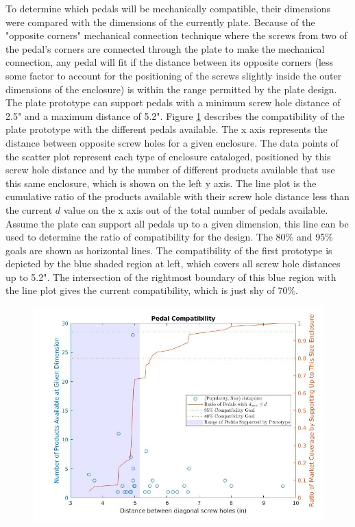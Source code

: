 \documentclass{article}
\begin{document}
	To determine which pedals will be mechanically compatible, their dimensions were compared with the dimensions of the currently plate.  Because of the "opposite corners" mechanical connection technique where the screws from two of the pedal's corners are connected through the plate to make the mechanical connection, any pedal will fit if the distance between its opposite corners (less some factor to account for the positioning of the screws slightly inside the outer dimensions of the enclosure) is within the range permitted by the plate design.  The plate prototype can support pedals with a minimum screw hole distance of 2.5" and a maximum distance of 5.2".  Figure \ref{fig:pedalcompatibility} describes the compatibility of the plate prototype with the different pedals available.  The x axis represents the distance between opposite screw holes for a given enclosure.  The data points of the scatter plot represent each type of enclosure cataloged, positioned by this screw hole distance and by the number of different products available that use this same enclosure, which is shown on the left y axis. The line plot is the cumulative ratio of the products available with their screw hole distance less than the current $d$ value on the x axis out of the total number of pedals available.  Assume the plate can support all pedals up to a given dimension, this line can be used to determine the ratio of compatibility for the design.  The 80\% and 95\% goals are shown as horizontal lines.  The compatibility of the first prototype is depicted by the blue shaded region at left, which covers all screw hole distances up to 5.2".  The intersection of the rightmost boundary of this blue region with the line plot gives the current compatibility, which is just shy of 70\%.

	\begin{figure}
		\centering
		\includegraphics[width = \textwidth]{PR4Images/PEdalCompatibility.jpg}
		\caption{}
		\label{fig:pedalcompatibility}
	\end{figure}
\end{document}
